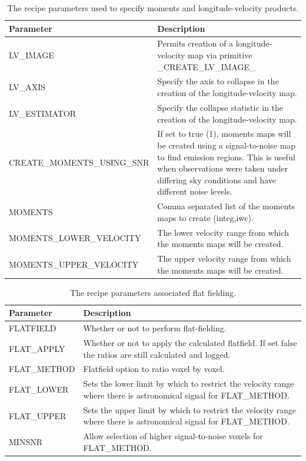 \documentclass[11pt,oneside,chapters]{starlink}
\begin{document}
\begin{table}[h!]
\begin{small}
\begin{tabular}{|p{7.5cm}|p{8cm}|}
\hline
\textbf{Parameter} & \textbf{Description} \\
\hline
LV\_IMAGE & Permits creation of a longitude-velocity map via primitive \_CREATE\_LV\_IMAGE\_\\
LV\_AXIS & Specify the axis to collapse in the creation of the longitude-velocity map.\\
LV\_ESTIMATOR & Specify the collapse statistic in the creation of the longitude-velocity map.\\
\hline
CREATE\_MOMENTS\_USING\_SNR & If set to true (1), moments maps will be created using a
                              signal-to-noise map to find emission regions. This is useful
                              when observations were taken under differing sky conditions
                              and have different noise levels.\\
\hline
MOMENTS & Comma separated list of the moments maps to create (integ,iwc).\\

MOMENTS\_LOWER\_VELOCITY & The lower velocity range from which the moments maps will be
                           created.\\
MOMENTS\_UPPER\_VELOCITY & The upper velocity range from which the moments maps will be
                           created.\\
\hline
\hline
\end{tabular}
\end{small}
\caption{\label{tab:moments_params}
  The recipe parameters used to specify moments and longitude-velocity products.}
\end{table}

\begin{table}[h!]
\begin{small}
\begin{tabular}{|p{6.8cm}|p{8.6cm}|}
\hline
\textbf{Parameter} & \textbf{Description} \\
\hline
FLATFIELD & Whether or not to perform flat-fielding.\\
FLAT\_APPLY & Whether or not to apply the calculated flatfield.  If set false
              the ratios are still calculated and logged.\\
FLAT\_METHOD & Flatfield option to ratio voxel by voxel.\\
FLAT\_LOWER & Sets the lower limit by which to restrict the velocity range where there is
              astronomical signal for FLAT\_METHOD.\\
FLAT\_UPPER & Sets the upper limit by which to restrict the velocity range where there is
              astronomical signal for FLAT\_METHOD.\\
MINSNR & Allow selection of higher signal-to-noise voxels for FLAT\_METHOD. \\
\hline
\end{tabular}
\end{small}
\caption{\label{tab:flat_params}
  The recipe parameters associated flat fielding.}
\end{table}
\end{document}
